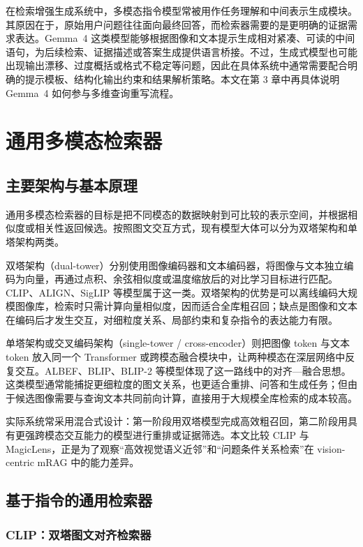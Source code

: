 在检索增强生成系统中，多模态指令模型常被用作任务理解和中间表示生成模块。其原因在于，原始用户问题往往面向最终回答，而检索器需要的是更明确的证据需求表达。Gemma~4 这类模型能够根据图像和文本提示生成相对紧凑、可读的中间语句，为后续检索、证据描述或答案生成提供语言桥接。不过，生成式模型也可能出现输出漂移、过度概括或格式不稳定等问题，因此在具体系统中通常需要配合明确的提示模板、结构化输出约束和结果解析策略。本文在第 3 章中再具体说明 Gemma~4 如何参与多维查询重写流程。

\section{通用多模态检索器}

\subsection{主要架构与基本原理}

通用多模态检索器的目标是把不同模态的数据映射到可比较的表示空间，并根据相似度或相关性返回候选。按照图文交互方式，现有模型大体可以分为双塔架构和单塔架构两类。

双塔架构（dual-tower）分别使用图像编码器和文本编码器，将图像与文本独立编码为向量，再通过点积、余弦相似度或温度缩放后的对比学习目标进行匹配。CLIP、ALIGN、SigLIP 等模型属于这一类\cite{radford2021clip,gomez2021align,zhai2023siglip}。双塔架构的优势是可以离线编码大规模图像库，检索时只需计算向量相似度，因而适合全库粗召回；缺点是图像和文本在编码后才发生交互，对细粒度关系、局部约束和复杂指令的表达能力有限。

单塔架构或交叉编码架构（single-tower / cross-encoder）则把图像 token 与文本 token 放入同一个 Transformer 或跨模态融合模块中，让两种模态在深层网络中反复交互。ALBEF、BLIP、BLIP-2 等模型体现了这一路线中的对齐—融合思想\cite{li2021albef,li2022blip,li2023blip2}。这类模型通常能捕捉更细粒度的图文关系，也更适合重排、问答和生成任务；但由于候选图像需要与查询文本共同前向计算，直接用于大规模全库检索的成本较高。

实际系统常采用混合式设计：第一阶段用双塔模型完成高效粗召回，第二阶段用具有更强跨模态交互能力的模型进行重排或证据筛选。本文比较 CLIP 与 MagicLens，正是为了观察“高效视觉语义近邻”和“问题条件关系检索”在 vision-centric mRAG 中的能力差异。

\subsection{基于指令的通用检索器}

\subsubsection{CLIP：双塔图文对齐检索器}

